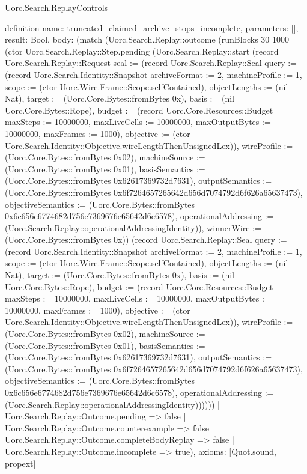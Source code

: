 \begin{lexlean}{Uorc.Search.ReplayControls}
\begin{semanticmodule}
definition{
  name: truncated_claimed_archive_stops_incomplete,
  parameters: [],
  result: Bool,
  body: (match (Uorc.Search.Replay::outcome (runBlocks 30 1000 (ctor Uorc.Search.Replay::Step.pending (Uorc.Search.Replay::start (record Uorc.Search.Replay::Request {seal := (record Uorc.Search.Replay::Seal {query := (record Uorc.Search.Identity::Snapshot {archiveFormat := 2, machineProfile := 1, scope := (ctor Uorc.Wire.Frame::Scope.selfContained), objectLengths := (nil Nat), target := (Uorc.Core.Bytes::fromBytes 0x), basis := (nil Uorc.Core.Bytes::Rope), budget := (record Uorc.Core.Resources::Budget {maxSteps := 10000000, maxLiveCells := 10000000, maxOutputBytes := 10000000, maxFrames := 1000}), objective := (ctor Uorc.Search.Identity::Objective.wireLengthThenUnsignedLex)}), wireProfile := (Uorc.Core.Bytes::fromBytes 0x02), machineSource := (Uorc.Core.Bytes::fromBytes 0x01), basisSemantics := (Uorc.Core.Bytes::fromBytes 0x62617369732d7631), outputSemantics := (Uorc.Core.Bytes::fromBytes 0x6f7264657265642d656d7074792d6f626a65637473), objectiveSemantics := (Uorc.Core.Bytes::fromBytes 0x6c656e6774682d756e7369676e65642d6c6578), operationalAddressing := (Uorc.Search.Replay::operationalAddressingIdentity)}), winnerWire := (Uorc.Core.Bytes::fromBytes 0x)}) (record Uorc.Search.Replay::Seal {query := (record Uorc.Search.Identity::Snapshot {archiveFormat := 2, machineProfile := 1, scope := (ctor Uorc.Wire.Frame::Scope.selfContained), objectLengths := (nil Nat), target := (Uorc.Core.Bytes::fromBytes 0x), basis := (nil Uorc.Core.Bytes::Rope), budget := (record Uorc.Core.Resources::Budget {maxSteps := 10000000, maxLiveCells := 10000000, maxOutputBytes := 10000000, maxFrames := 1000}), objective := (ctor Uorc.Search.Identity::Objective.wireLengthThenUnsignedLex)}), wireProfile := (Uorc.Core.Bytes::fromBytes 0x02), machineSource := (Uorc.Core.Bytes::fromBytes 0x01), basisSemantics := (Uorc.Core.Bytes::fromBytes 0x62617369732d7631), outputSemantics := (Uorc.Core.Bytes::fromBytes 0x6f7264657265642d656d7074792d6f626a65637473), objectiveSemantics := (Uorc.Core.Bytes::fromBytes 0x6c656e6774682d756e7369676e65642d6c6578), operationalAddressing := (Uorc.Search.Replay::operationalAddressingIdentity)})))))
    | Uorc.Search.Replay::Outcome.pending => false
    | Uorc.Search.Replay::Outcome.counterexample => false
    | Uorc.Search.Replay::Outcome.completeBodyReplay => false
    | Uorc.Search.Replay::Outcome.incomplete => true),
  axioms: [Quot.sound, propext]
}


\end{semanticmodule}
\end{lexlean}

